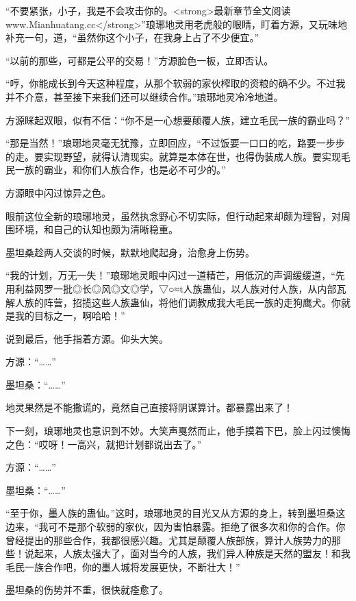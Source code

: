 
\begin{this_body}

“不要紧张，小子，我是不会攻击你的。<strong>最新章节全文阅读www.Mianhuatang.cc</strong>”琅琊地灵用老虎般的眼睛，盯着方源，又玩味地补充一句，道，“虽然你这个小子，在我身上占了不少便宜。”

“以前的那些，可都是公平的交易！”方源脸色一板，立即否认。

“哼，你能成长到今天这种程度，从那个软弱的家伙榨取的资粮的确不少。不过我并不介意，甚至接下来我们还可以继续合作。”琅琊地灵冷冷地道。

方源眯起双眼，似有不信：“你不是一心想要颠覆人族，建立毛民一族的霸业吗？”

“那是当然！”琅琊地灵毫无犹豫，立即回应，“不过饭要一口口的吃，路要一步步的走。要实现野望，就得认清现实。就算是本体在世，也得伪装成人族。要实现毛民一族的霸业，和你们人族合作，也是必不可少的。”

方源眼中闪过惊异之色。

眼前这位全新的琅琊地灵，虽然执念野心不切实际，但行动起来却颇为理智，对周围环境，和自己的认知也颇为清晰稳重。

墨坦桑趁两人交谈的时候，默默地爬起身，治愈身上伤势。

“我的计划，万无一失！”琅琊地灵眼中闪过一道精芒，用低沉的声调缓缓道，“先用利益网罗一批◎长◎风◎文◎学，▽○≈t人族蛊仙，以人族对付人族，从内部瓦解人族的阵营，招揽这些人族蛊仙，将他们调教成我大毛民一族的走狗鹰犬。你就是我的目标之一，啊哈哈！”

说到最后，他手指着方源。仰头大笑。

方源：“……”

墨坦桑：“……”

地灵果然是不能撒谎的，竟然自己直接将阴谋算计。都暴露出来了！

下一刻，琅琊地灵也意识到不妙。大笑声戛然而止，他手摸着下巴，脸上闪过懊悔之色：“哎呀！一高兴，就把计划都说出去了。”

方源：“……”

墨坦桑：“……”

“至于你，墨人族的蛊仙。”这时，琅琊地灵的目光又从方源的身上，转到墨坦桑这边来，“我可不是那个软弱的家伙，因为害怕暴露。拒绝了很多次和你的合作。你曾经提出的那些合作，我都很感兴趣。尤其是颠覆人族部族，算计人族势力的那些！说起来，人族太强大了，面对当今的人族，我们异人种族是天然的盟友！和我毛民一族合作吧，你的墨人城将发展更快，不断壮大！”

墨坦桑的伤势并不重，很快就痊愈了。


\end{this_body}
